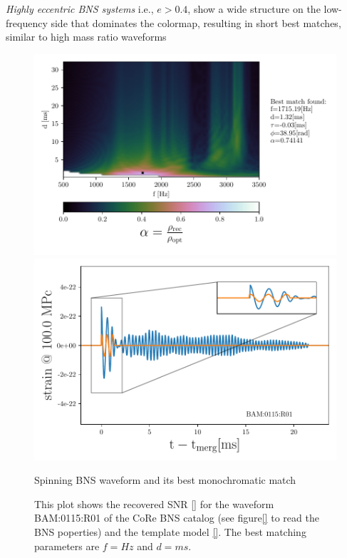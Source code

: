 \FloatBarrier
 

\newpage
\textit{Highly eccentric BNS systems} i.e., $e>0.4$, show a wide structure on the low-frequency side that dominates the colormap, resulting in short best matches, similar to high mass ratio waveforms


\begin{figure}[!htbp]
\begin{center}
\begin{minipage}[t]{0.5\linewidth}
\vspace{0pt}
\includegraphics[scale=0.6,trim={2mm 0 35mm 0},clip]{images/Data_analysis/results/2D_grid_9.pdf}
\end{minipage}%
\begin{minipage}[t]{0.5\linewidth}
\vspace{20pt}
\includegraphics[scale=0.45]{images/Data_analysis/results/2D_grid_10.pdf}
\end{minipage}
\captionsetup{width=0.8\textwidth}
\caption{Spinning BNS waveform and its best monochromatic match}
\caption*{This plot shows the recovered SNR \ref{} for the waveform BAM:0115:R01 of the CoRe BNS catalog \cite{}(see figure\ref{} to read the BNS poperties) and the template model \ref{}. The best matching parameters are $f=Hz$ and $d=ms$.}
\end{center}
\end{figure}

